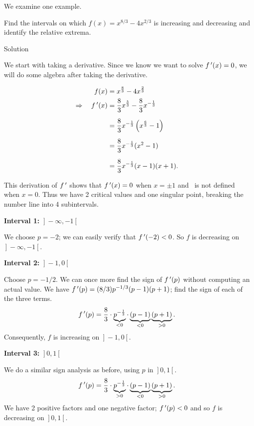 We examine one example. 
\begin{example}\label{ex_incr3}
Find the intervals on which $f(x) = x^{8/3}-4x^{2/3}$ is increasing and decreasing and identify the relative extrema.

Solution 

We start with taking a derivative. Since we know we want to solve $f\,'(x) = 0$, we will do some algebra after taking the derivative.

\allowdisplaybreaks
\begin{align*}
f(x) &= x^{\frac{8}{3}}-4x^{\frac{2}{3}} \\
\Rightarrow\quad f\,'(x) &= \frac{8}{3} x^{\frac{5}{3}} - \frac{8}{3}x^{-\frac{1}{3}}\\[0.2cm]
	&= \frac{8}{3}x^{-\frac{1}{3}}\left(x^{\frac{6}{3}}-1\right)\\[0.2cm]
	&=\frac{8}{3}x^{-\frac{1}{3}}(x^2-1)\\[0.2cm]
	&=\frac{8}{3}x^{-\frac{1}{3}}(x-1)(x+1).
\end{align*}

This derivation of $f\,'$ shows that $f\,'(x) = 0$ when $x=\pm 1$ and \fp\ is not defined when $x=0$. Thus we have 2 critical values and one singular point, breaking the number line into 4 subintervals.  

	

\begin{description}
\item \textbf{Interval 1: $\left.\right]-\infty,-1\left[\right.$}

We choose $p=-2$; we can easily verify that $f\,'(-2)<0$. So $f$ is decreasing on $\left.\right]-\infty,-1\left[\right.$.

\item \textbf{Interval 2:  $\left.\right]-1,0\left[\right.$}

 Choose $p=-1/2$. We can once more find the sign of $f\,'(p)$ without computing an actual value. We have $f\,'(p) = (8/3)p^{-1/3}(p-1)(p+1)$; find the sign of each of the three terms. 
		$$f\,'(p) = \frac{8}{3} \cdot \underbrace{p^{-\frac13}}_{<0}\cdot \underbrace{(p-1)}_{<0}\underbrace{(p+1)}_{>0}.$$
		Consequently,  $f$ is increasing on $\left.\right]-1,0\left[\right.$.
		
\item\textbf{Interval 3: $\left.\right]0,1\left[\right.$}

We do a similar sign analysis as before, using $p$ in $\left.\right]0,1\left[\right.$.
		$$f\,'(p) = \frac{8}{3} \cdot \underbrace{p^{-\frac13}}_{>0}\cdot \underbrace{(p-1)}_{<0}\underbrace{(p+1)}_{>0}.$$
		We have 2 positive factors and one negative factor; $f\,'(p)<0$ and so $f$ is decreasing on $\left.\right]0,1\left[\right.$.
		

\end{description}
\end{example}
